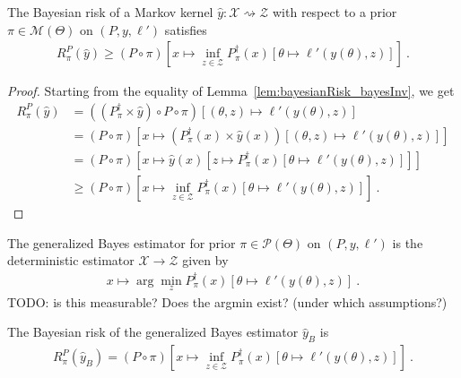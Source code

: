 \begin{lemma}
  \label{lem:bayesianRisk_ge_inf_bayesInv}
  \leanok
  The Bayesian risk of a Markov kernel $\hat{y} : \mathcal X \rightsquigarrow \mathcal Z$ with respect to a prior $\pi \in \mathcal M(\Theta)$ on $(P, y, \ell')$ satisfies
  \begin{align*}
  R^P_\pi(\hat{y}) \ge (P \circ \pi)\left[x \mapsto \inf_{z \in \mathcal Z} P_\pi^\dagger(x) \left[\theta \mapsto \ell'(y(\theta), z)\right]\right] \: .
  \end{align*}
\end{lemma}

\begin{proof}\leanok
{}
Starting from the equality of Lemma~\ref{lem:bayesianRisk_bayesInv}, we get
\begin{align*}
R^P_\pi(\hat{y})
&= ((P_\pi^\dagger \times \hat{y}) \circ P \circ \pi)\left[(\theta, z) \mapsto \ell'(y(\theta), z)\right]
\\
&= (P \circ \pi)\left[x \mapsto (P_\pi^\dagger(x) \times \hat{y}(x)) \left[(\theta, z) \mapsto \ell'(y(\theta), z)\right]\right]
\\
&= (P \circ \pi)\left[x \mapsto \hat{y}(x)\left[z \mapsto P_\pi^\dagger(x) \left[\theta \mapsto \ell'(y(\theta), z)\right]\right]\right]
\\
&\ge (P \circ \pi)\left[x \mapsto \inf_{z \in \mathcal Z} P_\pi^\dagger(x) \left[\theta \mapsto \ell'(y(\theta), z)\right]\right]
\: .
\end{align*}

\end{proof}

\begin{definition}
  \label{def:genBayesEstimator}
  \leanok
  The generalized Bayes estimator for prior $\pi \in \mathcal P(\Theta)$ on $(P, y, \ell')$ is the deterministic estimator $\mathcal X \to \mathcal Z$ given by
  \begin{align*}
  x \mapsto \arg\min_z P_\pi^\dagger(x)\left[\theta \mapsto \ell'(y(\theta), z)\right] \: .
  \end{align*}
  TODO: is this measurable? Does the argmin exist? (under which assumptions?)
\end{definition}

\begin{lemma}
  \label{lem:bayesianRisk_genBayesEstimator}
  \leanok
  The Bayesian risk of the generalized Bayes estimator $\hat{y}_B$ is
  \begin{align*}
  R^P_\pi(\hat{y}_B) = (P \circ \pi)\left[x \mapsto \inf_{z \in \mathcal Z} P_\pi^\dagger(x) \left[\theta \mapsto \ell'(y(\theta), z)\right]\right]
  \: .
  \end{align*}
\end{lemma}

